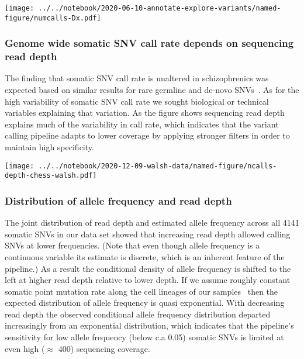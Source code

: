 \documentclass[letterpaper]{article}
\begin{document}
\texttt{[image: ../../notebook/2020-06-10-annotate-explore-variants/named-figure/numcalls-Dx.pdf]}


\subsubsection*{Genome wide somatic SNV call rate depends on sequencing read depth}

The finding that somatic SNV call rate is unaltered in schizophrenics was
expected based on similar results for rare germline and de-novo
SNVs~\citep{Purcell2014,Singh2017,Fromer2014,Rees2020}.
As for the high variability of somatic SNV call rate we sought 
biological or technical variables explaining that variation.  As the figure
shows sequencing read depth explains much of
the variability in call rate, which indicates that the variant calling
pipeline adapts to lower coverage by applying stronger filters in order to 
maintain high specificity.

\texttt{[image: ../../notebook/2020-12-09-walsh-data/named-figure/ncalls-depth-chess-walsh.pdf]}


\subsubsection*{Distribution of allele frequency and read depth}

The joint distribution of read depth and estimated allele frequency across all
4141 somatic SNVs in our data set showed that increasing read depth allowed
calling SNVs at lower frequencies.  (Note that even though allele frequency is
a continuous variable its estimate is discrete, which is an inherent feature
of the pipeline.)  As a result the conditional density of allele frequency is
shifted to the left at higher read depth relative to lower depth.  If we
assume roughly constant somatic point mutation rate along the cell lineages of
our samples~\citep{Rodin2021} then the expected distribution of allele
frequency is quasi exponential.  With decreasing read depth the observed
conditional allele frequency distribution departed increasingly from an
exponential distribution, which indicates that the pipeline's sensitivity for
low allele frequency (below c.a 0.05) somatic SNVs is limited at even high
(\(\approx\) 400) sequencing coverage.
\end{document}
